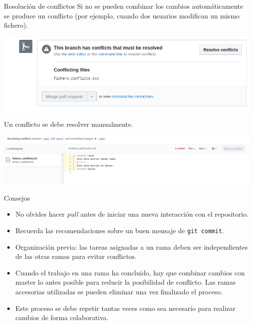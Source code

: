 \documentclass[xcolor={usenames,svgnames,dvipsnames}]{beamer}
\begin{document}
\begin{frame}[label={sec:org323838e}]{Resolución de conflictos}
Si no se pueden combinar los cambios automáticamente se produce un conflicto (por ejemplo, cuando dos usuarios modifican un mismo fichero).

\begin{center}
\includegraphics[width=.9\linewidth]{figs/conflict_web.png}
\end{center}

Un conflicto se debe resolver manualmente.
\begin{center}
\includegraphics[width=.9\linewidth]{figs/resolve_conflict_web.png}
\end{center}
\end{frame}

\begin{frame}[fragile,label={sec:orga2caa9b}]{Consejos}
 \begin{itemize}
\item \alert{No olvides hacer \emph{pull} antes de iniciar una nueva interacción con el repositorio}.

\item Recuerda las recomendaciones sobre un buen mensaje de \texttt{git commit}.

\item \alert{Organización previa}: las \alert{tareas} asignadas a un rama deben ser \alert{independientes} de las otras ramas para evitar conflictos.

\item Cuando el trabajo en una rama ha concluido, hay que \alert{combinar cambios con master lo antes posible} para reducir la posibilidad de conflicto. Las ramas accesorias utilizadas se pueden eliminar una vez finalizado el proceso.

\item Este proceso se debe repetir tantas veces como sea necesario para realizar cambios de forma colaborativa.
\end{itemize}
\end{frame}
\end{document}
